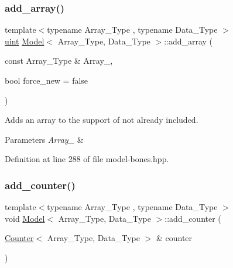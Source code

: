 \subsubsection{\texorpdfstring{add\+\_\+array()}{add\_array()}}
{\footnotesize\ttfamily template$<$typename Array\+\_\+\+Type , typename Data\+\_\+\+Type $>$ \\
\hyperlink{typedefs_8hpp_a91ad9478d81a7aaf2593e8d9c3d06a14}{uint} \hyperlink{class_model}{Model}$<$ Array\+\_\+\+Type, Data\+\_\+\+Type $>$\+::add\+\_\+array (\begin{DoxyParamCaption}\item[{const Array\+\_\+\+Type \&}]{Array\+\_\+,  }\item[{bool}]{force\+\_\+new = {\ttfamily false} }\end{DoxyParamCaption})\hspace{0.3cm}{\ttfamily [inline]}}



Adds an array to the support of not already included. 


\begin{DoxyParams}{Parameters}
{\em Array\+\_\+} & \\
\hline
\end{DoxyParams}


Definition at line 288 of file model-\/bones.\+hpp.

\mbox{\label{class_model_a1ed91acc6c747eabc8a83726c0ec7de5}} 
\subsubsection{\texorpdfstring{add\+\_\+counter()}{add\_counter()}\hspace{0.1cm}{\footnotesize\ttfamily [1/3]}}
{\footnotesize\ttfamily template$<$typename Array\+\_\+\+Type , typename Data\+\_\+\+Type $>$ \\
void \hyperlink{class_model}{Model}$<$ Array\+\_\+\+Type, Data\+\_\+\+Type $>$\+::add\+\_\+counter (\begin{DoxyParamCaption}\item[{\hyperlink{class_counter}{Counter}$<$ Array\+\_\+\+Type, Data\+\_\+\+Type $>$ \&}]{counter }\end{DoxyParamCaption})\hspace{0.3cm}{\ttfamily [inline]}}



